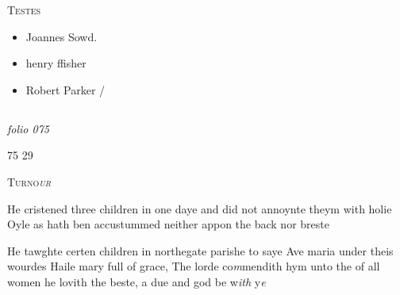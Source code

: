 \documentclass[12pt, a4paper]{book}
\begin{document}
 
 	\begin{center} {\scshape Testes} \end{center}\begin{itemize}
	 	
 		\item[]Joannes Sowd.
 		\item[]henry ffisher
 		\item[]Robert Parker /
 	\end{itemize}
 
 


            
            
\dotfill
						\newpage {} \subsection*{}  \subsection*{}

\textit{folio 075}


\begin{flushright}{\color{Mahogany}75} 29\end{flushright}
 

               
				\begin{center} \begin{large} {\scshape Turno\textit{ur}} \end{large} \end{center}
			

	
		
				\marginpar[\vspace{0.5cm}{\textcolor{Gray}{ceremonies}}]{}
			
		
				\marginpar[\vspace{0.5cm}{\textcolor{Gray}{n}}]{}
			
		
		\ifthenelse{\isodd{\thepage}}
		{\reversemarginpar}
		{\normalmarginpar}
		He cristened three children in one daye and did not
  annoynte theym with holie Oyle as hath ben accustummed
 neither appon the back nor breste
 
		\ifthenelse{\isodd{\thepage}}
		{\reversemarginpar}
		{\normalmarginpar}
		He tawghte certen children in northegate parishe to
 saye Ave maria under theis wourdes Haile mary
 full of grace, The lorde co\textit{m}mendith hym unto the
 of all women he lovith the beste, a due and god be w\textit{ith} y\textit{e}
 
\end{document}
